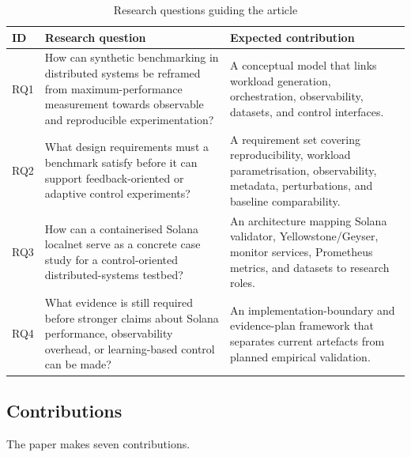 \documentclass[11pt,a4paper]{article}
\begin{document}
\begin{table}[H]
\centering
\caption{Research questions guiding the article}
\label{tab:research-questions}
\begin{tabularx}{\textwidth}{L{1.2cm}Y Y}
\toprule
\textbf{ID} & \textbf{Research question} & \textbf{Expected contribution} \\
\midrule
RQ1 & How can synthetic benchmarking in distributed systems be reframed from maximum-performance measurement towards observable and reproducible experimentation? & A conceptual model that links workload generation, orchestration, observability, datasets, and control interfaces. \\
RQ2 & What design requirements must a benchmark satisfy before it can support feedback-oriented or adaptive control experiments? & A requirement set covering reproducibility, workload parametrisation, observability, metadata, perturbations, and baseline comparability. \\
RQ3 & How can a containerised Solana localnet serve as a concrete case study for a control-oriented distributed-systems testbed? & An architecture mapping Solana validator, Yellowstone/Geyser, monitor services, Prometheus metrics, and datasets to research roles. \\
RQ4 & What evidence is still required before stronger claims about Solana performance, observability overhead, or learning-based control can be made? & An implementation-boundary and evidence-plan framework that separates current artefacts from planned empirical validation. \\
\bottomrule
\end{tabularx}
\end{table}

\subsection{Contributions}
\label{subsec:contributions}

The paper makes seven contributions.
\end{document}
